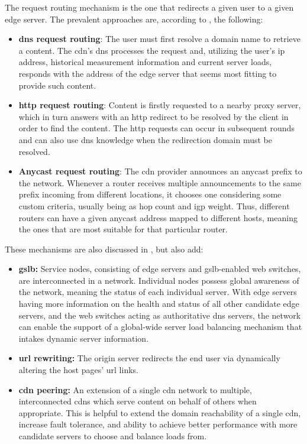     The request routing mechanism is the one that redirects a given user to a given edge server.
    The prevalent approaches are, according to \cite{wichtlhuber2017}, the following:

\begin{itemize}
    \item \textbf{\gls{dns} request routing}: The user must first resolve a domain name to retrieve a content. The \gls{cdn}'s \gls{dns} processes the request and, utilizing the user's \gls{ip} address, historical measurement information and current server loads, responds with the address of the edge server that seems most fitting to provide such content.
    \item \textbf{\gls{http} request routing}: Content is firstly requested to a nearby proxy server, which in turn answers with an \gls{http} redirect to be resolved by the client in order to find the content.
        The \gls{http} requests can occur in subsequent rounds and can also use \gls{dns} knowledge when the redirection domain must be resolved.
    \item \textbf{Anycast request routing}: The \gls{cdn} provider announces an anycast prefix to the network.
        Whenever a router receives multiple announcements to the same prefix incoming from different locations, it chooses one considering some custom criteria, usually being \gls{as} hop count and \gls{igp} weight.
        Thus, different routers can have a given anycast address mapped to different hosts, meaning the ones that are most suitable for that particular router.
\end{itemize}

    These mechanisms are also discussed in \cite{cdn-survey}, but also add:

\begin{itemize}
    \item \textbf{\gls{gslb}:} Service nodes, consisting of edge servers and \gls{gslb}-enabled web switches, are interconnected in a network.
        Individual nodes possess global awareness of the network, meaning the status of each individual server.
        With edge servers having more information on the health and status of all other candidate edge servers, and the web switches acting as authoritative \gls{dns} servers, the network can enable the support of a global-wide server load balancing mechanism that intakes dynamic server information.
    \item \textbf{\gls{url} rewriting:} The origin server redirects the end user via dynamically altering the host pages' \gls{url} links.
    \item \textbf{\gls{cdn} peering:} An extension of a single \gls{cdn} network to multiple, interconnected \glspl{cdn} which serve content on behalf of others when appropriate.
        This is helpful to extend the domain reachability of a single \gls{cdn}, increase fault tolerance, and ability to achieve better performance with more candidate servers to choose and balance loads from.
\end{itemize}

